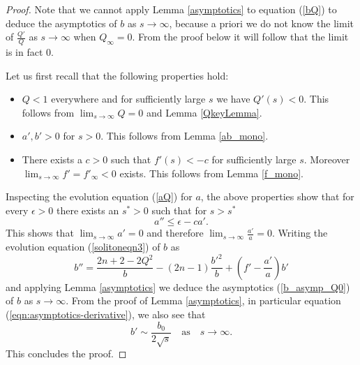 \documentclass{amsart}
\theoremstyle{definition}
\theoremstyle{remark}
\numberwithin{equation}{section}
\begin{document}
\begin{proof}
Note that we cannot apply Lemma \ref{asymptotics} to equation (\ref{bQ}) to deduce the asymptotics of $b$ as $s \rightarrow \infty$, because a priori we do not know the limit of $\frac{Q'}{Q}$ as $s \rightarrow \infty$ when $Q_\infty = 0$. From the proof below it will follow that the limit is in fact $0$.

Let us first recall that the following properties hold:
\begin{itemize}
\item $Q < 1$ everywhere and for sufficiently large $s$ we have $Q'(s) < 0$. This follows from $\lim_{s \rightarrow \infty} Q = 0$ and Lemma \ref{QkeyLemma}.
\item $a', b' > 0$ for $s >0$. This follows from Lemma \ref{ab_mono}.
\item There exists a $c>0$ such that $f'(s) < -c$ for sufficiently large $s$. Moreover $\lim_{s \rightarrow \infty} f' = f'_\infty < 0$ exists. This follows from Lemma \ref{f_mono}.
\end{itemize}
Inspecting the evolution equation (\ref{aQ}) for $a$, the above properties show that for every $\epsilon >0$ there exists an $s^\ast>0$ such that for $s > s^\ast$
\begin{equation*}
a'' \leq \epsilon - c a'.
\end{equation*} 
This shows that $\lim_{s\rightarrow \infty} a' = 0$ and therefore $\lim_{s \rightarrow \infty} \frac{a'}{a} = 0$. Writing the evolution equation (\ref{solitoneqn3}) of $b$ as
\begin{equation*}
b'' = \frac{2n+2 - 2 Q^2}{b} - (2n-1) \frac{b'^2}{b} + \left(f' - \frac{a'}{a} \right)b'
\end{equation*}
and applying Lemma \ref{asymptotics} we deduce the asymptotics (\ref{b_asymp_Q0}) of $b$ as $s \rightarrow \infty$. From the proof of Lemma \ref{asymptotics}, 
in particular equation (\ref{eqn:asymptotics-derivative}), we also see that 
\begin{equation*}
b' \sim  \frac{b_0}{2 \sqrt{s}} \quad \textrm{as} \quad s \rightarrow \infty. 
\end{equation*}
This concludes the proof.
\end{proof}
\end{document}
